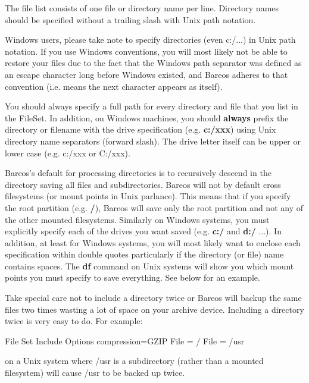 \begin{description}
    The file list
    consists of one file or directory name per line.  Directory names should be
    specified without a trailing slash with Unix path notation.

    Windows users, please take note to specify directories (even c:/...) in
    Unix path notation. If you use Windows conventions, you will most likely
    not be able to restore your files due to the fact that the Windows
    path separator was defined as an escape character long before Windows
    existed, and Bareos adheres to that convention (i.e. means the next character
    appears as itself).

    You should always specify a full path for every directory and file that you
    list in the FileSet.  In addition, on Windows machines, you should {\bf
    always} prefix the directory or filename with the drive specification
    (e.g.  {\bf c:/xxx}) using Unix directory name separators
    (forward slash).  The drive letter itself can be upper or lower case (e.g.
    c:/xxx or C:/xxx).

    Bareos's default for processing directories is to recursively descend in
    the directory saving all files and subdirectories.  Bareos will not by
    default cross filesystems (or mount points in Unix parlance).  This means
    that if you specify the root partition (e.g.  {\bf /}), Bareos will save
    only the root partition and not any of the other mounted filesystems.
    Similarly on Windows systems, you must explicitly specify each of the
    drives you want saved (e.g.
    {\bf c:/} and {\bf d:/} ...). In addition, at least for Windows systems, you
    will most likely want to enclose each specification within double quotes
    particularly if the directory (or file) name contains spaces. The {\bf df}
    command on Unix systems will show you which mount points you must specify to
    save everything. See below for an example.

Take special care not to include a directory twice or Bareos will backup
the same files two times wasting a lot of space on your archive device.
Including a directory twice is very easy to do.  For example:

\begin{bconfig}{File Set}
  Include {
    Options {
      compression=GZIP
    }
    File = /
    File = /usr
  }
\end{bconfig}
on a Unix system where /usr is a subdirectory (rather than a mounted
filesystem) will cause /usr to be backed up twice.


\end{description}
